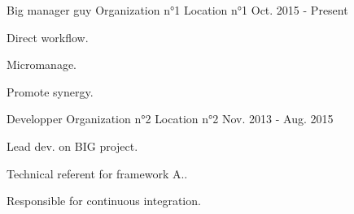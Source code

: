 


\begin{cventries}


\cventry
{Big manager guy} %
{Organization n°1} %
{Location n°1} %
{Oct. 2015 - Present} %
{ %
\begin{cvitems}
\item {Direct workflow.}
\item {Micromanage.}
\item {Promote synergy.}
\end{cvitems}
}


\cventry
{Developper} %
{Organization n°2} %
{Location n°2} %
{Nov. 2013 - Aug. 2015} %
{ %
\begin{cvitems}
\item {Lead dev. on BIG project.}
\item {Technical referent for framework A..}
\item {Responsible for continuous integration.}
\end{cvitems}
}


\end{cventries}